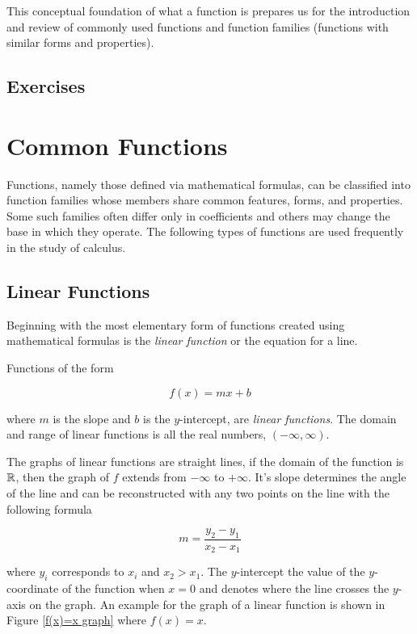 This conceptual foundation of what a  function is prepares us for the introduction and review of commonly used functions and function families (functions with similar forms and properties).

\subsection{Exercises}

\section{Common Functions}
Functions, namely those defined via mathematical formulas, can be classified into function families whose members share common features, forms, and properties. Some such families often differ only in coefficients and others may change the base in which they operate. The following types of functions are used frequently in the study of calculus.

\subsection{Linear Functions}
Beginning with the most elementary form of functions created using mathematical formulas is the \textit{linear function} or the equation for a line.

\begin{definition}
    Functions of the form

    \begin{equation}
        f(x) = mx + b
    \end{equation}

    \noindent where $m$ is the slope and $b$ is the $y$-intercept, are \textit{linear functions}. The domain and range of linear functions is all the real numbers, $(-\infty,\infty)$.
\end{definition}

The graphs of linear functions are straight lines, if the domain of the function is $\mathbb{R}$, then the graph of $f$ extends from $-\infty$ to $+\infty$. It's slope determines the angle of the line and can be reconstructed with any two points on the line with the following formula

\begin{equation}
    m = \frac{y_2-y_1}{x_2-x_1}
    \label{slopeofaline}
\end{equation}

\noindent where $y_i$ corresponds to $x_i$ and $x_2 > x_1$. The $y$-intercept the value of the $y$-coordinate of the function when $x=0$ and denotes where the line crosses the $y$-axis on the graph. An example for the graph of a linear function is shown in Figure \ref{f(x)=x graph} where $f(x) = x$.

